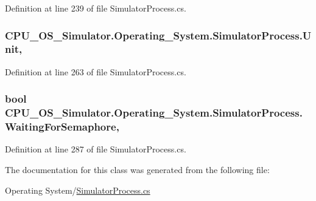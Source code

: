 Definition at line 239 of file Simulator\+Process.\+cs.

\hypertarget{class_c_p_u___o_s___simulator_1_1_operating___system_1_1_simulator_process_ab00659160e7658c9d07136a1785c6d64}{}
\subsubsection[{Unit}]{ C\+P\+U\+\_\+\+O\+S\+\_\+\+Simulator.\+Operating\+\_\+\+System.\+Simulator\+Process.\+Unit\hspace{0.3cm}{\ttfamily [get]}, {\ttfamily [set]}}\label{class_c_p_u___o_s___simulator_1_1_operating___system_1_1_simulator_process_ab00659160e7658c9d07136a1785c6d64}


Definition at line 263 of file Simulator\+Process.\+cs.

\hypertarget{class_c_p_u___o_s___simulator_1_1_operating___system_1_1_simulator_process_af99949814519836d531c9d8c16323a84}{}
\subsubsection[{Waiting\+For\+Semaphore}]{\setlength{\rightskip}{0pt plus 5cm}bool C\+P\+U\+\_\+\+O\+S\+\_\+\+Simulator.\+Operating\+\_\+\+System.\+Simulator\+Process.\+Waiting\+For\+Semaphore\hspace{0.3cm}{\ttfamily [get]}, {\ttfamily [set]}}\label{class_c_p_u___o_s___simulator_1_1_operating___system_1_1_simulator_process_af99949814519836d531c9d8c16323a84}


Definition at line 287 of file Simulator\+Process.\+cs.



The documentation for this class was generated from the following file\+:\begin{DoxyCompactItemize}
\item 
Operating System/\hyperlink{_simulator_process_8cs}{Simulator\+Process.\+cs}\end{DoxyCompactItemize}
